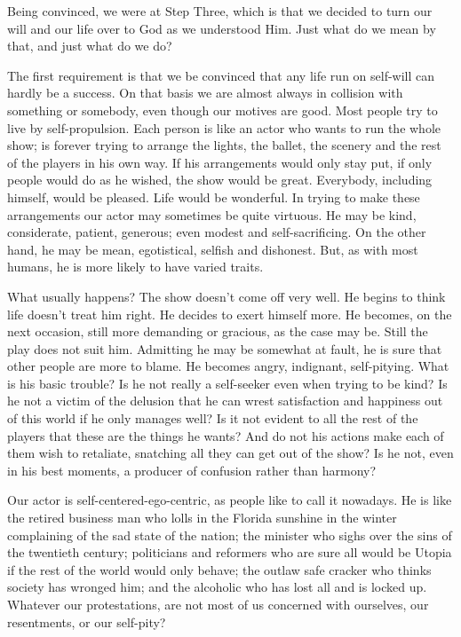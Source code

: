 \begin{biblechapter}
    Being convinced, we were at Step Three, 
    which is that we decided to turn our will 
    and our life over to God as we understood Him.
\verse Just what do we mean by that, and just what do we do?

\verse The first requirement is that we be convinced 
    that any life run on self-will can hardly be a success.
\verse On that basis we are almost always in collision 
    with something or somebody, 
    even though our motives are good.
\verse Most people try to live by self-propulsion.
\verse Each person is like an actor who wants to run the whole show; 
    is forever trying to arrange the lights, 
    the ballet, the scenery and the rest of the players 
    in his own way.
\verse If his arrangements would only stay put, 
    if only people would do as he wished, 
    the show would be great.
\verse Everybody, including himself, would be pleased.
\verse Life would be wonderful.
\verse In trying to make these arrangements 
    our actor may sometimes be quite virtuous.
\verse He may be kind, considerate, patient, generous; 
    even modest and self-sacrificing.
\verse On the other hand, he may be 
    mean, egotistical, selfish and dishonest.
\verse But, as with most humans, he is more likely to have varied traits.

\verse What usually happens?
\verse The show doesn't come off very well.
\verse He begins to think life doesn't treat him right.
\verse He decides to exert himself more.
\verse He becomes, on the next occasion, 
    still more demanding or gracious, 
    as the case may be.
\verse Still the play does not suit him.
\verse Admitting he may be somewhat at fault, 
    he is sure that other people are more to blame.
\verse He becomes angry, indignant, self-pitying.
\verse What is his basic trouble?
\verse Is he not really a self-seeker even when trying to be kind?
\verse Is he not a victim of the delusion that 
    he can wrest satisfaction and happiness out of this world 
    if he only manages well?
\verse Is it not evident to all the rest of the players 
    that these are the things he wants?
\verse And do not his actions make each of them wish to retaliate, 
    snatching all they can get out of the show?
\verse Is he not, even in his best moments, 
    a producer of confusion rather than harmony?

\verse Our actor is self-centered-ego-centric, 
    as people like to call it nowadays.
\verse He is like the retired business man 
    who lolls in the Florida sunshine in the winter 
    complaining of the sad state of the nation; 
    the minister who sighs over the sins of the twentieth century; 
    politicians and reformers who are sure all would be Utopia 
    if the rest of the world would only behave; 
    the outlaw safe cracker who thinks society has wronged him; 
    and the alcoholic who has lost all and is locked up.
\verse Whatever our protestations, 
    are not most of us concerned with ourselves, 
    our resentments, 
    or our self-pity?


\end{biblechapter}
